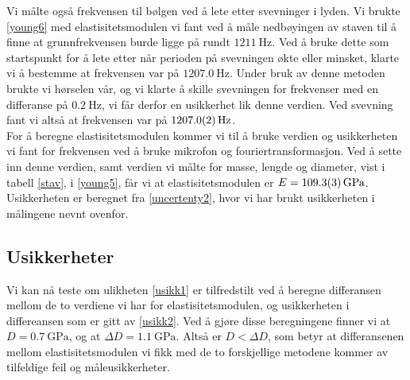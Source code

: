 \documentclass[%
 reprint,
 amsmath,amssymb,
 aps,
 norsk,
 booktabs
]{revtex4-1}
\begin{document}
Vi målte også frekvensen til bølgen ved å lete etter svevninger i lyden. Vi brukte \eqref{young6} med elastisitetsmodulen vi fant ved å måle nedbøyingen av staven til å finne at grunnfrekvensen burde ligge på rundt $\SI{1211}{\hertz}$. Ved å bruke dette som startspunkt for å lete etter når perioden på svevningen økte eller minsket, klarte vi å bestemme at frekvensen var på $\SI{1207.0}{\hertz}$. Under bruk av denne metoden brukte vi hørselen vår, og vi klarte å skille svevningen for frekvenser med en differanse på $\SI{0.2}{\hertz}$, vi får derfor en usikkerhet lik denne verdien. Ved svevning fant vi altså at frekvensen var på $\SI{1207.0\pm0.2}{\hertz}$.\\
For å beregne elastisitetsmodulen kommer vi til å bruke verdien og usikkerheten vi fant for frekvensen ved å bruke mikrofon og fouriertransformasjon. Ved å sette inn denne verdien, samt verdien vi målte for masse, lengde og diameter, vist i tabell \vref{stav}, i \eqref{young5}, får vi at elastisitetsmodulen er $E = \SI{109.3\pm0.3}{\giga\pascal}$. Usikkerheten er beregnet fra \eqref{uncertenty2}, hvor vi har brukt usikkerheten i målingene nevnt ovenfor.
\subsection{Usikkerheter}
Vi kan nå teste om ulikheten \eqref{usikk1} er tilfredstilt ved å beregne differansen mellom de to verdiene vi har for elastisitetsmodulen, og usikkerheten i differeansen som er gitt av \eqref{usikk2}. Ved å gjøre disse beregningene finner vi at $D = \SI{0.7}{\giga\pascal}$, og at $\Delta D = \SI{1.1}{\giga\pascal}$. Altså er $D<\Delta D$, som betyr at differansenen mellom elastisitetsmodulen vi fikk med de to forskjellige metodene kommer av tilfeldige feil og måleusikkerheter.
\end{document}
